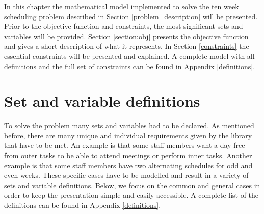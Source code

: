 In this chapter the mathematical model implemented to solve the ten week scheduling problem described in Section \ref{problem_description} will be presented. Prior to the objective function and constraints, the most significant sets and variables will be provided. Section \ref{section:obj} presents the objective function and gives a short description of what it represents. In Section \ref{constraints} the essential constraints will be presented and explained. A complete model with all definitions and the full set of constraints can be found in Appendix \ref{definitions}. %
\section{Set and variable definitions} \label{variables}
To solve the problem many sets and variables had to be declared. As mentioned before, there are many unique and individual requirements given by the library that have to be met. An example is that some staff members want a day free from outer tasks to be able to attend meetings or perform inner tasks. Another example is that some staff members have two alternating schedules for odd and even weeks. These specific cases have to be modelled and result in a variety of sets and variable definitions. Below, we focus on the common and general cases in order to keep the presentation simple and easily accessible. A complete list of the definitions can be found in Appendix \ref{definitions}. \\
 \\
  \\
	 	\\
                  \\
	 \\
                            \\
	 \\
                    \\
                \\
               \\

